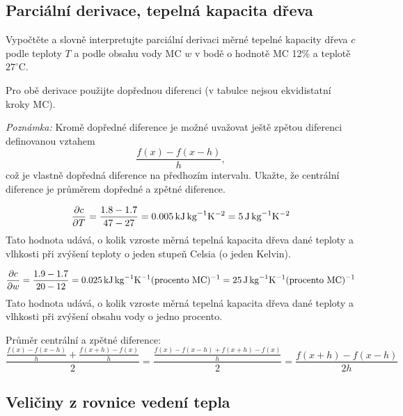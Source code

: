 \subsection{Parciální derivace, tepelná kapacita dřeva}

Vypočtěte a slovně interpretujte parciální derivaci měrné tepelné kapacity dřeva $c$ podle teploty $T$ a podle obsahu vody MC $w$ v bodě o hodnotě MC 12\% a teplotě $27^\circ\mathrm C$.

Pro obě derivace použijte dopřednou diferenci (v tabulce nejsou ekvidistatní kroky MC).

\textit{Poznámka:} Kromě dopředné diference je možné uvažovat ještě zpětou diferenci definovanou vztahem $$\frac{f(x)-f(x-h)}{h},$$ což je vlastně dopředná diference na předhozím intervalu. Ukažte, že centrální diference je průměrem dopředné a zpětné diference.

\reseni

$$\pdv{c}{T}=\frac{1.8-1.7}{47-27}=0.005 \,\mathrm{kJ}\,\mathrm{kg}^{-1}\mathrm{K}^{-2}=5 \,\mathrm{J}\,\mathrm{kg}^{-1}\mathrm{K}^{-2}$$
Tato hodnota udává, o kolik vzroste měrná tepelná kapacita dřeva dané teploty a vlhkosti při zvýšení teploty o jeden stupeň Celsia (o jeden Kelvin).

$$\pdv{c}{w}=\frac{1.9-1.7}{20-12}=0.025 \,\mathrm{kJ}\,\mathrm{kg}^{-1}\mathrm{K}^{-1}(\text{procento MC})^{-1}=25 \,\mathrm{J}\,\mathrm{kg}^{-1}\mathrm{K}^{-1}(\text{procento MC})^{-1}$$
Tato hodnota udává, o kolik vzroste měrná tepelná kapacita dřeva dané teploty a vlhkosti při zvýšení obsahu vody o jedno procento.



Průměr centrální a zpětné diference:
\begin{dmath*}
  \frac{\frac{f(x)-f(x-h)}{h} + \frac{f(x+h)-f(x)}{h}}{2}=
  \frac{\frac{f(x)-f(x-h)+f(x+h)-f(x)}{h}}{2}=
\frac{f(x+h)-f(x-h)}{2h}
\end{dmath*}

\konec

\stranka
\subsection{Veličiny z rovnice vedení tepla}


